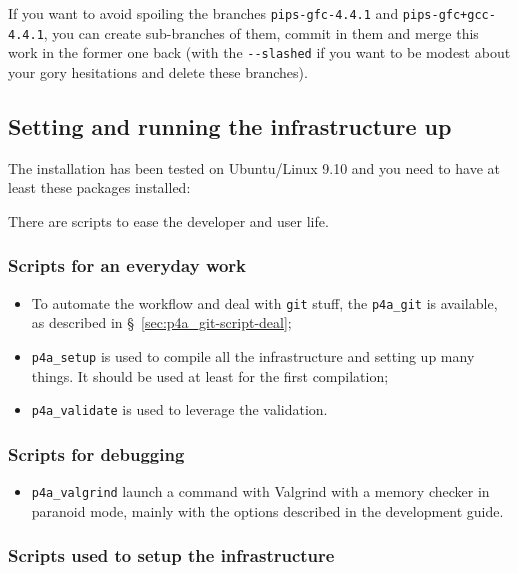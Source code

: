 \documentclass[a4paper]{article}
\begin{document}
If you want to avoid spoiling the branches \texttt{pips-gfc-4.4.1} and
\texttt{pips-gfc+gcc-4.4.1}, you can create sub-branches of them, commit in
them and merge this work in the former one back (with the \verb|--slashed|
if you want to be modest about your gory hesitations \smiley{} and delete
these branches).


\subsection{Setting and running the infrastructure up}
\label{sec:setup}

The installation has been tested on Ubuntu/Linux 9.10 and you need to have
at least these packages installed:


There are scripts to ease the developer and user life.


\subsubsection{Scripts for an everyday work}
\label{sec:an-everyday-work}

\begin{itemize}
\item To automate the \Apfa workflow and deal with \texttt{git} stuff, the
  \verb|p4a_git| is available, as described in
  \S~\ref{sec:p4a_git-script-deal};
\item \verb|p4a_setup| is used to compile all the \Apfa infrastructure and
  setting up many things. It should be used at least for the first
  compilation;
\item \verb|p4a_validate| is used to leverage the \Apips validation.
\end{itemize}


\subsubsection{Scripts for debugging}
\label{sec:scripts-debugging}

\begin{itemize}
\item \verb|p4a_valgrind| launch a command with Valgrind with a memory
  checker in paranoid mode, mainly with the options described in the
  \Apips development guide.
\end{itemize}


\subsubsection{Scripts used to setup the infrastructure}
\label{sec:scripts-used-setup}
\end{document}
